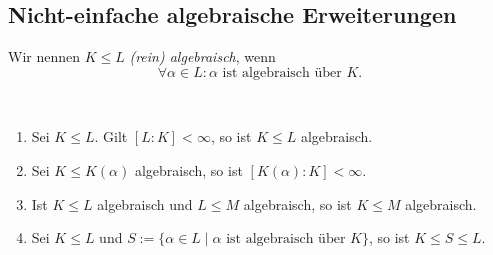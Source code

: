 \subsection{Nicht-einfache algebraische Erweiterungen}

\begin{definition}
    Wir nennen $K \leq L$ \emph{(rein) algebraisch}, wenn
    $$ \forall \alpha \in L: \alpha \text{ ist algebraisch über } K. $$
\end{definition}

\begin{proposition}{\ }
    \begin{enumerate}
        \item Sei $K \leq L$. Gilt $[L:K] < \infty$, so ist $K \leq L$ algebraisch.
        \item Sei $K \leq K(\alpha)$ algebraisch, so ist $[K(\alpha) : K] < \infty$.
        \item Ist $K \leq L$ algebraisch und $L \leq M$ algebraisch, so ist $K \leq M$ algebraisch.
        \item Sei $K \leq L$ und $S := \{ \alpha \in L \mid \alpha \text{ ist algebraisch über } K \}$, so ist $K \leq S \leq L$.
    \end{enumerate}
\end{proposition}

